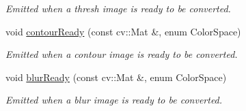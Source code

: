\begin{DoxyCompactItemize}
\begin{DoxyCompactList}\small\item\em Emitted when a thresh image is ready to be converted. \end{DoxyCompactList}\item 
void \hyperlink{classKFBallTracker_a58317068463b0db8b6809e45e1b44728}{contour\+Ready} (const cv\+::\+Mat \&, enum Color\+Space)\hypertarget{classKFBallTracker_a58317068463b0db8b6809e45e1b44728}{}\label{classKFBallTracker_a58317068463b0db8b6809e45e1b44728}

\begin{DoxyCompactList}\small\item\em Emitted when a contour image is ready to be converted. \end{DoxyCompactList}\item 
void \hyperlink{classKFBallTracker_ac7b3230716e0f9a36852219b0bf7bad0}{blur\+Ready} (const cv\+::\+Mat \&, enum Color\+Space)\hypertarget{classKFBallTracker_ac7b3230716e0f9a36852219b0bf7bad0}{}\label{classKFBallTracker_ac7b3230716e0f9a36852219b0bf7bad0}

\begin{DoxyCompactList}\small\item\em Emitted when a blur image is ready to be converted. \end{DoxyCompactList}\end{DoxyCompactItemize}
